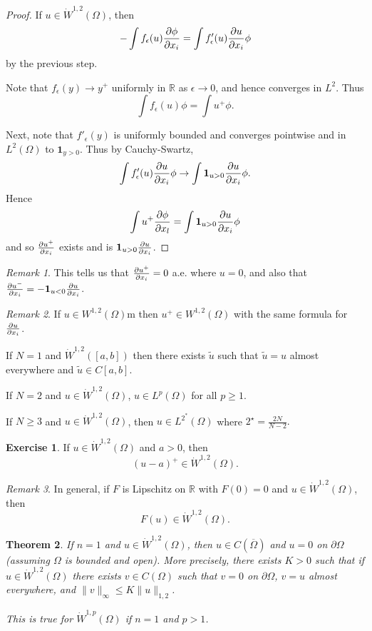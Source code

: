 \documentclass[10pt, oneside, reqno]{amsart}
\theoremstyle{plain}%
\newtheorem{thm}{Theorem}[section]
\numberwithin{equation}{section}
\theoremstyle{definition}
\newtheorem{exer}[thm]{Exercise}
\theoremstyle{remark}
\newtheorem*{rem}{Remark}
\newcommand{\R}{\mathbb{R}}
\begin{document}
\begin{proof}
	If $u \in \dot W^{1, 2}(\Omega)$, then \begin{align*}
		-\int f_\epsilon (u) \frac{\partial \phi}{\partial x_i} = \int f'_\epsilon(u) \frac{\partial u}{\partial x_i} \phi
	\end{align*} by the previous step.   
	
	Note that $f_\epsilon (y) \rightarrow y^+$ uniformly in $\R$  as $\epsilon \rightarrow 0$, and hence converges in $L^2$.  Thus \[
		\int f_\epsilon(u) \phi = \int u^+ \phi.
	\]  
	
	Next, note that $f'_\epsilon (y)$ is uniformly bounded and converges pointwise and in $L^2(\Omega)$ to $\mathbf{1}_{y > 0}$.  Thus by Cauchy-Swartz, \[
		\int f'_\epsilon(u) \frac{\partial u}{\partial x_i} \phi \rightarrow \int \mathbf{1}_{u > 0} \frac{\partial u}{\partial x_i} \phi.
	\] Hence \[
		\int u^+ \frac{\partial \phi}{\partial x_l} = \int \mathbf{1}_{u > 0} \frac{\partial u}{\partial x_i} \phi
	\] and so $\frac{\partial u^+}{\partial x_i}$ exists and is $\mathbf{1}_{u > 0} \frac{\partial u}{\partial x_i}$.
\end{proof}  

\begin{rem}
	This tells us that $\frac{\partial u^+}{\partial x_i} = 0$ a.e. where $u = 0$, and also that $\frac{\partial u^-}{\partial x_i} = -\mathbf{1}_{u < 0} \frac{\partial u}{\partial x_i}$.
\end{rem}

\begin{rem}
	If $u \in  W^{1, 2}(\Omega)$m then $u^+ \in W^{1, 2}(\Omega)$ with the same formula for $\frac{\partial u}{\partial x_i}$.  
	
	If $N = 1$ and $\dot W^{1, 2}([a, b])$ then there exists $\tilde u$ such that $\tilde u  = u$ almost everywhere and $\tilde u \in C[a, b]$.
	
	If $N = 2$ and $u \in \dot W^{1, 2}(\Omega)$, $u \in L^p(\Omega)$ for all $p \geq 1$. 
	
	If $N \geq 3$ and $u \in \dot W^{1, 2}(\Omega)$, then $u \in L^{2^*}(\Omega)$ where $2^\star = \frac{2N}{N-2}.$
\end{rem}

\begin{exer}
	If $u \in \dot W^{1, 2}(\Omega)$ and $a > 0$, then \[
		(u-a)^+ \in \dot W^{1, 2}(\Omega).
	\]
\end{exer}

\begin{rem}
	In general, if $F$ is Lipschitz on $\R$ with $F(0) = 0$ and $u \in \dot W^{1, 2}(\Omega)$, then \[
		F(u) \in \dot W^{1, 2}(\Omega).
	\]
\end{rem}

\begin{thm}
	\label{thm:his_thm_7.2}
	If $n = 1$ and $u \in \dot W^{1, 2}(\Omega)$, then $u \in C(\overline \Omega)$ and $u = 0$ on $\partial \Omega$ (assuming $\Omega$ is bounded and open).  More precisely, there exists $K > 0$ such that if $u \in \dot W^{1, 2}(\Omega)$ there exists $v \in C(\Omega)$ such that $v = 0$ on $\partial \Omega$, $v = u$ almost everywhere, and $\| v \|_\infty \leq K \| u \|_{1, 2}$.  
	
	This is true for $\dot W^{1, p}(\Omega)$ if $n = 1$ and $p > 1$.
\end{thm}
\end{document}
